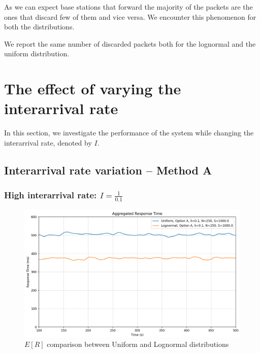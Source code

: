\documentclass{report}
\begin{document}
\begin{flushleft}
As we can expect base stations that forward the majority of the packets are the ones that discard few of them and vice versa. We encounter this phenomenon for both the distributions.
\vspace{1em}

We report the same number of discarded packets both for the lognormal and the uniform distribution.
\end{flushleft}





\section{The effect of varying the interarrival rate}
In this section, we investigate the performance of the system while changing the interarrival rate, denoted by $I$. 

\subsection{Interarrival rate variation -- Method A}

\subsubsection*{High interarrival rate: $I = \frac{1}{0.1}$}

\begin{figure}[H]
    \centering
    \includegraphics[width=\textwidth]{img/plots/I-vary/R_A_I01.png}
    \caption{$E[R]$ comparison between Uniform and Lognormal distributions}
\end{figure}
\end{document}
